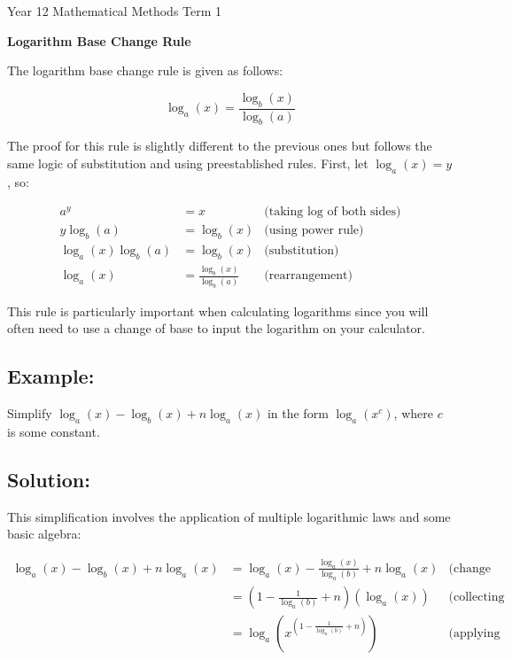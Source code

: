 \documentclass[12pt]{article}
\begin{document}

\newpage %

\noindent Year 12 Mathematical Methods \hfill Term 1

\begin{center}
    \Large\textbf{Logarithm Base Change Rule}
\end{center}

\noindent The logarithm base change rule is given as follows:

\[
\log_a(x) = \frac{\log_b(x)}{\log_b(a)}
\]

\noindent The proof for this rule is slightly different to the previous ones but follows the same logic of substitution and using preestablished rules. First, let \( \log_a(x) = y \), so:

\[
\begin{aligned}
a^y &= x & \text{(taking log of both sides)} \\
y \log_b(a) &= \log_b(x) & \text{(using power rule)} \\
\log_a(x) \log_b(a) &= \log_b(x) & \text{(substitution)} \\
\log_a(x) &= \frac{\log_b(x)}{\log_b(a)} & \text{(rearrangement)}
\end{aligned}
\]

\noindent This rule is particularly important when calculating logarithms since you will often need to use a change of base to input the logarithm on your calculator.

\subsection*{Example:}

\noindent Simplify \( \log_a(x) - \log_b(x) + n\log_a(x) \) in the form \( \log_a(x^c) \), where \( c \) is some constant.

\subsection*{Solution:}

\noindent This simplification involves the application of multiple logarithmic laws and some basic algebra:

\[
\begin{aligned}
\log_a(x) - \log_b(x) + n\log_a(x) &= \log_a(x) - \frac{\log_a(x)}{\log_a(b)} + n\log_a(x) & \text{(change of base)} \\
&= \left(1 - \frac{1}{\log_a(b)} + n\right) (\log_a(x)) & \text{(collecting terms)} \\
&= \log_a\left(x^{\left(1-\frac{1}{\log_a(b)}+n\right)}\right) & \text{(applying power rule)}
\end{aligned}
\]
\end{document}
